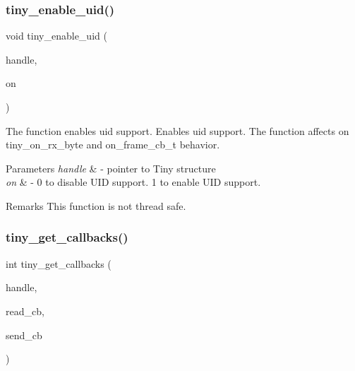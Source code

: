 \subsubsection{\texorpdfstring{tiny\+\_\+enable\+\_\+uid()}{tiny\_enable\_uid()}}
{\footnotesize\ttfamily void tiny\+\_\+enable\+\_\+uid (\begin{DoxyParamCaption}\item[{\hyperlink{structSTinyData}{S\+Tiny\+Data} $\ast$}]{handle,  }\item[{uint8\+\_\+t}]{on }\end{DoxyParamCaption})}



The function enables uid support. Enables uid support. The function affects on tiny\+\_\+on\+\_\+rx\+\_\+byte and on\+\_\+frame\+\_\+cb\+\_\+t behavior. 


\begin{DoxyParams}{Parameters}
{\em handle} & -\/ pointer to Tiny structure \\
\hline
{\em on} & -\/ 0 to disable U\+ID support. 1 to enable U\+ID support. \\
\hline
\end{DoxyParams}
\begin{DoxyRemark}{Remarks}
This function is not thread safe. 
\end{DoxyRemark}
\mbox{\label{group__ADVANCED__API_gabe38a1f81966f6901eb2f6969b568298}} 
\subsubsection{\texorpdfstring{tiny\+\_\+get\+\_\+callbacks()}{tiny\_get\_callbacks()}}
{\footnotesize\ttfamily int tiny\+\_\+get\+\_\+callbacks (\begin{DoxyParamCaption}\item[{\hyperlink{structSTinyData}{S\+Tiny\+Data} $\ast$}]{handle,  }\item[{\hyperlink{tiny__types_8h_ad6bf709565b8aecb9e6ecf196f219d54}{on\+\_\+frame\+\_\+cb\+\_\+t} $\ast$}]{read\+\_\+cb,  }\item[{\hyperlink{tiny__types_8h_ad6bf709565b8aecb9e6ecf196f219d54}{on\+\_\+frame\+\_\+cb\+\_\+t} $\ast$}]{send\+\_\+cb }\end{DoxyParamCaption})}



